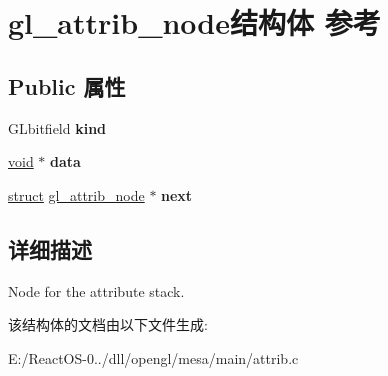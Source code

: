 \hypertarget{structgl__attrib__node}{}\section{gl\+\_\+attrib\+\_\+node结构体 参考}
\label{structgl__attrib__node}
\subsection*{Public 属性}
\begin{DoxyCompactItemize}
\item 
\mbox{\label{structgl__attrib__node_a633741d5c4994b9cb9e9fd16539d6c1e}} 
G\+Lbitfield {\bfseries kind}
\item 
\mbox{\label{structgl__attrib__node_a9bdc1a36ec717cf524db45e10848d63f}} 
\hyperlink{interfacevoid}{void} $\ast$ {\bfseries data}
\item 
\mbox{\label{structgl__attrib__node_abebe24ca34f206733abd94f94fcb3698}} 
\hyperlink{interfacestruct}{struct} \hyperlink{structgl__attrib__node}{gl\+\_\+attrib\+\_\+node} $\ast$ {\bfseries next}
\end{DoxyCompactItemize}


\subsection{详细描述}
Node for the attribute stack. 

该结构体的文档由以下文件生成\+:\begin{DoxyCompactItemize}
\item 
E\+:/\+React\+O\+S-\/0../dll/opengl/mesa/main/attrib.\+c\end{DoxyCompactItemize}
